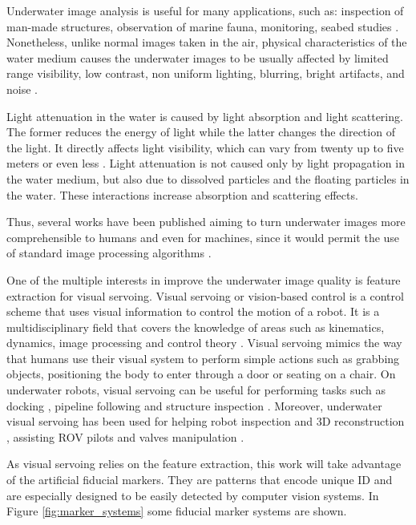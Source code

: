 \documentclass[conference, letterpaper]{IEEEtran}
\begin{document}
Underwater image analysis is useful for many applications, such as:
inspection of man-made structures, observation of marine fauna, monitoring,
seabed studies \cite{Aulinas2011}. Nonetheless, unlike normal images taken in
the air, physical characteristics of the water medium causes the underwater
images to be usually affected by limited range visibility, low contrast, non
uniform lighting, blurring, bright artifacts, and noise \cite{Yang2012}.

Light attenuation in the water is caused by light absorption and light
scattering. The former reduces the energy of light while the latter changes the
direction of the light. It directly affects light visibility, which can vary
from twenty up to five meters or even less \cite{Schettini2010}. Light
attenuation is not caused only by light propagation in the water medium, but
also due to dissolved particles and the floating particles in the water. These
interactions increase absorption and scattering effects.

Thus, several works have been published aiming to turn underwater images more
comprehensible to humans and even for machines, since it would permit the use
of standard image processing algorithms \cite{Schettini2010,
sankpal2016nonuniform, rodrigues2016enhancement, bazeille2006automatic,
arnold2005preprocessing, chiang2012underwater, iqbal2007underwater}.

One of the multiple interests in improve the underwater image quality is
feature extraction for visual servoing.  Visual servoing or vision-based
control is a control scheme that uses visual information to control the motion
of a robot. It is a multidisciplinary field that covers the knowledge of areas
such as kinematics, dynamics, image processing and control theory
\cite{Hutchinson1996}. Visual servoing mimics the way that humans use their
visual system to perform simple actions such as grabbing objects, positioning
the body to enter through a door or seating on a chair. On underwater robots,
visual servoing can be useful for performing tasks such as docking
\cite{Lee2003}, pipeline following \cite{Rives1997} and structure inspection
\cite{KRUPINSKI2015274}.  Moreover, underwater visual servoing has been used
for helping robot inspection and 3D reconstruction \cite{4302315}, assisting
ROV pilots \cite{4099090} and valves manipulation \cite{1282820}.

As visual servoing relies on the feature extraction, this work will take
advantage of the artificial fiducial markers. They are patterns that encode
unique ID and are especially designed to be easily detected by computer vision
systems. In Figure \ref{fig:marker_systems} some fiducial marker systems are
shown.
\end{document}
